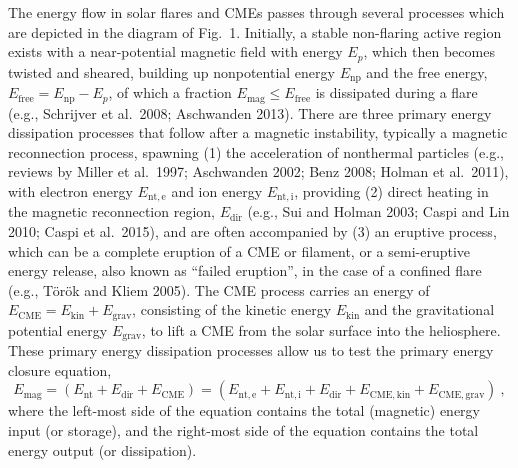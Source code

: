 \documentclass[10pt,preprint]{aastex}  %
\begin{document}
The energy flow in solar flares and CMEs passes through several 
processes which are depicted in the diagram of Fig.~1. Initially,
a stable non-flaring active region exists with a near-potential
magnetic field with energy $E_p$, which then becomes twisted and 
sheared, building up nonpotential energy $E_{\mathrm{np}}$ and the free 
energy, $E_{\mathrm{free}}=E_{\mathrm{np}}-E_{p}$, of which a fraction 
$E_{\mathrm{mag}} \le E_{\mathrm{free}}$ 
is dissipated during a flare (e.g., Schrijver 
et al.~2008; Aschwanden 2013). There are three primary energy
dissipation processes that follow after a magnetic instability,
typically a magnetic reconnection process, spawning (1) the acceleration
of nonthermal particles (e.g., reviews by Miller et al.~1997;
Aschwanden 2002; Benz 2008; Holman et al.~2011), 
with electron energy $E_{\mathrm{nt,e}}$ and
ion energy $E_{\mathrm{nt,i}}$, providing (2) direct heating in
the magnetic reconnection region, $E_{\mathrm{dir}}$ 
(e.g., Sui and Holman 2003; Caspi and Lin 2010; Caspi et al.~2015), 
and are often accompanied by (3) an eruptive process, 
which can be a complete eruption of a CME or filament, or a semi-eruptive
energy release, also known as ``failed eruption'', in the case of a 
confined flare (e.g., T\"or\"ok and Kliem 2005). The CME process carries
an energy of $E_{\mathrm{CME}}=E_{\mathrm{kin}} + E_{\mathrm{grav}}$, consisting
of the kinetic energy $E_{\mathrm{kin}}$ and the gravitational potential energy
$E_{\mathrm{grav}}$, to lift a CME from the solar surface into the
heliosphere. These primary energy dissipation processes allow us
to test the primary energy closure equation,
\begin{equation}
	E_{\mathrm{mag}} = 
	( E_{\mathrm{nt}} + E_{\mathrm{dir}} + E_{\mathrm{CME}} ) = 
	( E_{\mathrm{nt,e}} + E_{\mathrm{nt,i}} + E_{\mathrm{dir}} + 
          E_{\mathrm{CME,kin}} + E_{\mathrm{CME,grav}} ) \ ,
\end{equation}
where the left-most side of the equation contains the total (magnetic) 
energy input (or storage), and the right-most side of the equation 
contains the total energy output (or dissipation).
\end{document}
